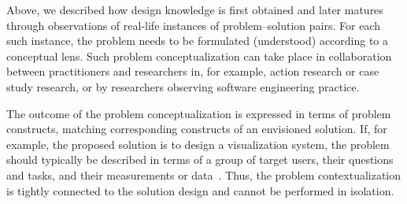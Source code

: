 \documentclass[graybox]{svmult}
\newcommand{\peggy}[1]{\textcolor{blue}{{\it [Peggy says: #1]}}}
\newcommand{\peggy}[1]{}
\begin{document}
 Above, we described how design knowledge is first obtained and later matures through observations of real-life instances of problem--solution pairs. For each such instance, the problem needs to be formulated (understood) according to a conceptual lens. Such problem conceptualization can take place in collaboration between practitioners and researchers in, for example, action research or case study research, or by researchers observing software engineering practice.


The outcome of the problem conceptualization is expressed in terms of problem constructs, matching corresponding constructs of an envisioned solution. If, for example, the proposed solution is to design a visualization system, the problem should typically be described in terms of a group of target users, their questions and tasks, and their measurements or data~\cite{meyer_nested_2015}. Thus, the problem contextualization is tightly connected to the solution design and cannot be performed in isolation. 





\end{document}
